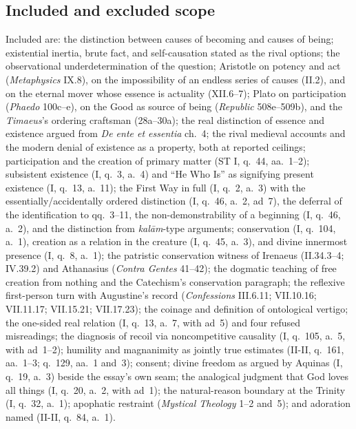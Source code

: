\subsection{Included and excluded scope}

Included are: the distinction between causes of becoming and causes of being; existential inertia, brute fact, and self-causation stated as the rival options; the observational underdetermination of the question; Aristotle on potency and act (\emph{Metaphysics} IX.8), on the impossibility of an endless series of causes (II.2), and on the eternal mover whose essence is actuality (XII.6--7); Plato on participation (\emph{Phaedo} 100c--e), on the Good as source of being (\emph{Republic} 508e--509b), and the \emph{Timaeus}'s ordering craftsman (28a--30a); the real distinction of essence and existence argued from \emph{De ente et essentia} ch.~4; the rival medieval accounts and the modern denial of existence as a property, both at reported ceilings; participation and the creation of primary matter (ST I, q.~44, aa.~1--2); subsistent existence (I, q.~3, a.~4) and ``He Who Is'' as signifying present existence (I, q.~13, a.~11); the First Way in full (I, q.~2, a.~3) with the essentially/accidentally ordered distinction (I, q.~46, a.~2, ad~7), the deferral of the identification to qq.~3--11, the non-demonstrability of a beginning (I, q.~46, a.~2), and the distinction from \emph{kal\=am}-type arguments; conservation (I, q.~104, a.~1), creation as a relation in the creature (I, q.~45, a.~3), and divine innermost presence (I, q.~8, a.~1); the patristic conservation witness of Irenaeus (II.34.3--4; IV.39.2) and Athanasius (\emph{Contra Gentes} 41--42); the dogmatic teaching of free creation from nothing and the Catechism's conservation paragraph; the reflexive first-person turn with Augustine's record (\emph{Confessions} III.6.11; VII.10.16; VII.11.17; VII.15.21; VII.17.23); the coinage and definition of ontological vertigo; the one-sided real relation (I, q.~13, a.~7, with ad~5) and four refused misreadings; the diagnosis of recoil via noncompetitive causality (I, q.~105, a.~5, with ad~1--2); humility and magnanimity as jointly true estimates (II-II, q.~161, aa.~1--3; q.~129, aa.~1 and~3); consent; divine freedom as argued by Aquinas (I, q.~19, a.~3) beside the essay's own seam; the analogical judgment that God loves all things (I, q.~20, a.~2, with ad~1); the natural-reason boundary at the Trinity (I, q.~32, a.~1); apophatic restraint (\emph{Mystical Theology} 1--2 and~5); and adoration named (II-II, q.~84, a.~1).

